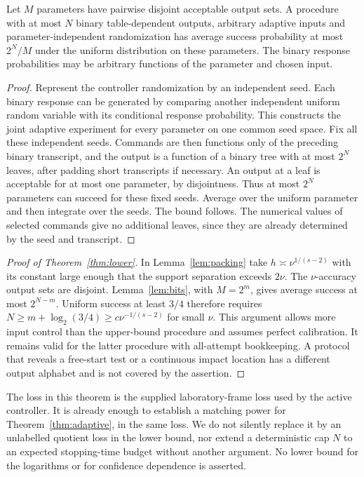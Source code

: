 \begin{lemma}
\label{lem:bits}
Let $M$ parameters have pairwise disjoint acceptable output sets.
A procedure with at most $N$ binary table-dependent outputs, arbitrary
adaptive inputs and parameter-independent randomization has average
success probability at most $2^N/M$ under the uniform distribution on
these parameters. The binary response probabilities may be arbitrary
functions of the parameter and chosen input.
\end{lemma}
\begin{proof}
Represent the controller randomization by an independent seed. Each
binary response can be generated by comparing another independent
uniform random variable with its conditional response probability.
This constructs the joint adaptive experiment for every parameter on
one common seed space. Fix all these independent seeds. Commands are
then functions only of the preceding binary transcript, and the output
is a function of a binary tree with at most $2^N$ leaves, after padding
short transcripts if necessary. An output at a leaf is acceptable for
at most one parameter, by disjointness. Thus at most $2^N$ parameters
can succeed for these fixed seeds. Average over the uniform parameter
and then integrate over the seeds. The bound follows. The numerical
values of selected commands give no additional leaves, since they are
already determined by the seed and transcript.
\end{proof}

\begin{proof}[Proof of Theorem~\ref{thm:lower}]
In Lemma~\ref{lem:packing} take
$h\asymp\nu^{1/(s-2)}$ with its constant large enough that the support
separation exceeds $2\nu$. The $\nu$-accuracy output sets are disjoint.
Lemma~\ref{lem:bits}, with $M=2^m$, gives average success at most
$2^{N-m}$. Uniform success at least $3/4$ therefore requires
$N\ge m+\log_2(3/4)\ge c\nu^{-1/(s-2)}$ for small $\nu$.
This argument allows more input control than the upper-bound procedure
and assumes perfect calibration. It remains valid for the latter
procedure with all-attempt bookkeeping. A protocol that reveals a
free-start test or a continuous impact location has a different output
alphabet and is not covered by the assertion.
\end{proof}

The loss in this theorem is the supplied laboratory-frame loss used by
the active controller. It is already enough to establish a matching
power for Theorem~\ref{thm:adaptive}, in the same loss. We do not silently
replace it by an unlabelled quotient loss in the lower bound, nor extend
a deterministic cap $N$ to an expected stopping-time budget without
another argument. No lower bound for the logarithms or for confidence
dependence is asserted.

